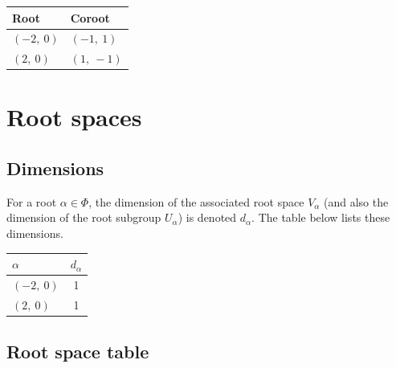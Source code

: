 \documentclass[11pt]{article}
\newcommand{\noi}{\noindent}
\theoremstyle{definition}
\newtheorem{definition}{Definition}[section]
\newif\ifsummablepairs
\begin{document}
\bigskip

\noindent \begin{tabular}{|l|l|}
    \hline
    \textbf{Root} & \textbf{Coroot} \\
    \hline
    $\left( -2, \  0\right)$ & $\left( -1, \  1\right)$ \\
    \hline
    $\left( 2, \  0\right)$ & $\left( 1, \  -1\right)$ \\
    \hline
\end{tabular}


\ifsummablepairs
\subsection{Linear combinations of roots}

\begin{definition}
For two roots $\alpha, \beta$ in a root system $\Phi$, the set of positive integral linear combinations of $\alpha, \beta$ that are also roots is denoted
\(
	(\alpha, \beta) = \{ i \alpha + j \beta \in \Phi : i, j \in \mathbb{Z}_{\ge 1} \}
\).
\end{definition}
\noi 
\fi

\newpage
\section{Root spaces}

\subsection{Dimensions}

For a root $\alpha \in \Phi$, the dimension of the associated root space $V_\alpha$ (and also the dimension of the root subgroup $U_\alpha$) is denoted $d_\alpha$. The table below lists these dimensions.

\bigskip

\noindent \begin{tabular}{|l|c|}
    \hline
    \textbf{$\alpha$} & \textbf{$d_{\alpha}$} \\
    \hline
    $\left( -2, \  0\right)$ & 1 \\
    \hline
    $\left( 2, \  0\right)$ & 1 \\
    \hline
\end{tabular}


\subsection{Root space table}
\end{document}
